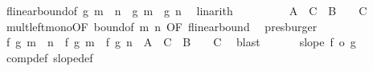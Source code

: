 \begin{isabellebody}
\ f{\isacharunderscore}{\kern0pt}linear{\isacharunderscore}{\kern0pt}bound{\isacharparenleft}{\kern0pt}{}{\isacharparenright}{\kern0pt}{\isacharbrackleft}{\kern0pt}of\ {\isachardoublequoteopen}g\ {\isacharparenleft}{\kern0pt}m\ {\isacharplus}{\kern0pt}\ n{\isacharparenright}{\kern0pt}\ {\isacharminus}{\kern0pt}\ {\isacharparenleft}{\kern0pt}g\ m\ {\isacharplus}{\kern0pt}\ g\ n{\isacharparenright}{\kern0pt}{\isachardoublequoteclose}{\isacharbrackright}{\kern0pt}\ \isamarkupfalse%
\ linarith\isanewline
\ \ \ \ \isamarkupfalse%
\ \isamarkupfalse%
\ {\isachardoublequoteopen}{\isachardot}{\kern0pt}{\isachardot}{\kern0pt}{\isachardot}{\kern0pt}\ {\isasymle}\ A\ {\isacharasterisk}{\kern0pt}\ C{\isacharprime}{\kern0pt}\ {\isacharplus}{\kern0pt}\ B\ {\isacharplus}{\kern0pt}\ {}\ {\isacharasterisk}{\kern0pt}\ C{\isachardoublequoteclose}\ \isamarkupfalse%
\ mult{\isacharunderscore}{\kern0pt}left{\isacharunderscore}{\kern0pt}mono{\isacharbrackleft}{\kern0pt}OF\ bound{\isacharprime}{\kern0pt}{\isacharbrackleft}{\kern0pt}of\ m\ n{\isacharbrackright}{\kern0pt}{\isacharcomma}{\kern0pt}\ OF\ f{\isacharunderscore}{\kern0pt}linear{\isacharunderscore}{\kern0pt}bound{\isacharparenleft}{\kern0pt}{}{\isacharparenright}{\kern0pt}{\isacharbrackright}{\kern0pt}\ \isamarkupfalse%
\ presburger\isanewline
\ \ \ \ \isamarkupfalse%
\ \isamarkupfalse%
\ {\isachardoublequoteopen}{\isasymbar}f\ {\isacharparenleft}{\kern0pt}g\ {\isacharparenleft}{\kern0pt}m\ {\isacharplus}{\kern0pt}\ n{\isacharparenright}{\kern0pt}{\isacharparenright}{\kern0pt}\ {\isacharminus}{\kern0pt}\ {\isacharparenleft}{\kern0pt}f\ {\isacharparenleft}{\kern0pt}g\ m{\isacharparenright}{\kern0pt}\ {\isacharplus}{\kern0pt}\ f\ {\isacharparenleft}{\kern0pt}g\ n{\isacharparenright}{\kern0pt}{\isacharparenright}{\kern0pt}{\isasymbar}\ {\isasymle}\ A\ {\isacharasterisk}{\kern0pt}\ C{\isacharprime}{\kern0pt}\ {\isacharplus}{\kern0pt}\ B\ {\isacharplus}{\kern0pt}\ {}\ {\isacharasterisk}{\kern0pt}\ C{\isachardoublequoteclose}\ \isamarkupfalse%
\ blast\isanewline
\ \ \isacommand{{\isacharbraceright}{\kern0pt}}\isamarkupfalse%
\isanewline
\ \ \isamarkupfalse%
\ {\isachardoublequoteopen}slope\ {\isacharparenleft}{\kern0pt}f\ o\ g{\isacharparenright}{\kern0pt}{\isachardoublequoteclose}\ \isamarkupfalse%
\ comp{\isacharunderscore}{\kern0pt}def\ slope{\isacharunderscore}{\kern0pt}def\ \isamarkupfalse%

\end{isabellebody}
